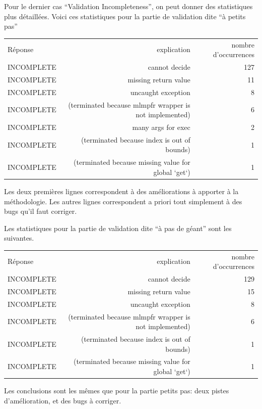 \documentclass[a4paper,11pt]{article}
\begin{document}
Pour le dernier cas ``Validation Incompleteness'', on peut donner des
statistiques plus détaillées. Voici ces statistiques pour la partie de
validation dite ``à petits pas''
  \begin{center}
  \begin{tabular}{|l|r|r|}
  \rowcolor{gray!50} Réponse
  & \multicolumn{1}{p{0.65\textwidth}|}{explication}
  & \multicolumn{1}{p{0.13\textwidth}|}{nombre d'occurrences}
    \\
INCOMPLETE & cannot decide	& 127 \\
INCOMPLETE & missing return value & 11 \\
INCOMPLETE & uncaught exception	& 8 \\
INCOMPLETE & (terminated because mlmpfr wrapper is not implemented) & 6 \\
INCOMPLETE & many args for exec	& 2 \\
INCOMPLETE & (terminated because index is out of bounds) & 1 \\
INCOMPLETE & (terminated because missing value for global `get`) & 1 \\
\end{tabular}
\end{center}
Les deux premières lignes correspondent à des améliorations à apporter
à la méthodologie. Les autres lignes correspondent a priori tout
simplement à des bugs qu'il faut corriger.

Les statistiques pour la
partie de validation dite ``à pas de géant'' sont les suivantes.
\begin{center}
  \begin{tabular}{|l|r|r|}
  \rowcolor{gray!50} Réponse
  & \multicolumn{1}{p{0.65\textwidth}|}{explication}
  & \multicolumn{1}{p{0.13\textwidth}|}{nombre d'occurrences}
    \\
INCOMPLETE & cannot decide	& 129 \\
INCOMPLETE & missing return value  &	15 \\
INCOMPLETE & uncaught exception	& 8 \\
INCOMPLETE &  (terminated because mlmpfr wrapper is not implemented) &	6 \\
INCOMPLETE & (terminated because index is out of bounds) &	1 \\
    INCOMPLETE & (terminated because missing value for global `get`) &	1 \\
  \end{tabular}
\end{center}
Les conclusions sont les mêmes que pour la partie petits pas: deux
pistes d'amélioration, et des bugs à corriger.
\end{document}
